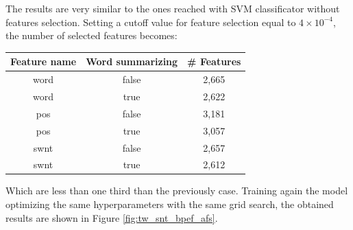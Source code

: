 
The results are very similar to the ones reached with SVM classificator without features selection. Setting a cutoff value for feature selection equal to $4\times10^{-4}$, the number of selected features becomes:

\begin{center}
	\begin{tabular}{ c  c  c } 
		\hline
		\textbf{Feature name} & \textbf{Word summarizing} & \textbf{\# Features} \\
		\hline
		word & false & 2,665 \\ 
		\hline
		word & true & 2,622 \\ 
		\hline
		pos & false & 3,181 \\ 
		\hline
		pos & true & 3,057 \\ 
		\hline
		swnt & false & 2,657 \\ 
		\hline
		swnt & true & 2,612 \\ 
		\hline
	\end{tabular}
\end{center}


Which are less than one third than the previously case. Training again the model optimizing the same hyperparameters with the same grid search, the obtained results are shown in Figure \ref{fig:tw_snt_bpef_afs}.


